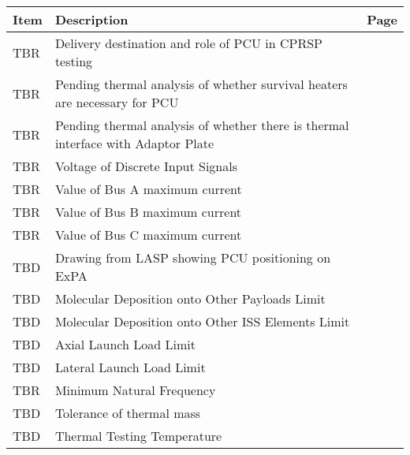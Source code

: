 
            \clearpage
            \sffamily
            \bfseries
            \normalfont
            \centering
            \begin{table}[htbp]
            \begin{minipage}{\linewidth}
            \setlength{\tymax}{0.5\linewidth}
            \centering
            \small\begin{tabular}{| >{\centering\arraybackslash}m{1.25in}| >{\centering\arraybackslash}m{2.95in}| >{\centering\arraybackslash}m{1.5in}|} \hline
            \bfseries{Item} & \bfseries{Description} & \bfseries{Page}\\
            \hline
            TBR & Delivery destination and role of PCU in CPRSP testing & \pageref{tbx_1}  \\ 
 \hline 
TBR & Pending thermal analysis of whether survival heaters are necessary for PCU & \pageref{tbx_2}  \\ 
 \hline 
TBR & Pending thermal analysis of whether there is thermal interface with Adaptor Plate & \pageref{tbx_3}  \\ 
 \hline 
TBR & Voltage of Discrete Input Signals & \pageref{tbx_4}  \\ 
 \hline 
TBR & Value of Bus A maximum current & \pageref{tbx_5}  \\ 
 \hline 
TBR & Value of Bus B maximum current & \pageref{tbx_6}  \\ 
 \hline 
TBR & Value of Bus C maximum current & \pageref{tbx_7}  \\ 
 \hline 
TBD & Drawing from LASP showing PCU positioning on ExPA & \pageref{tbx_8}  \\ 
 \hline 
TBD & Molecular Deposition onto Other Payloads Limit & \pageref{tbx_9}  \\ 
 \hline 
TBD & Molecular Deposition onto Other ISS Elements Limit & \pageref{tbx_10}  \\ 
 \hline 
TBD & Axial Launch Load Limit & \pageref{tbx_11}  \\ 
 \hline 
TBD & Lateral Launch Load Limit & \pageref{tbx_12}  \\ 
 \hline 
TBR & Minimum Natural Frequency & \pageref{tbx_13}  \\ 
 \hline 
TBD & Tolerance of thermal mass & \pageref{tbx_14}  \\ 
 \hline 
TBD & Thermal Testing Temperature & \pageref{tbx_15}  \\ 
 \hline 
\end{tabular}
        \end{minipage}
        \end{table}
        \raggedright
        \clearpage